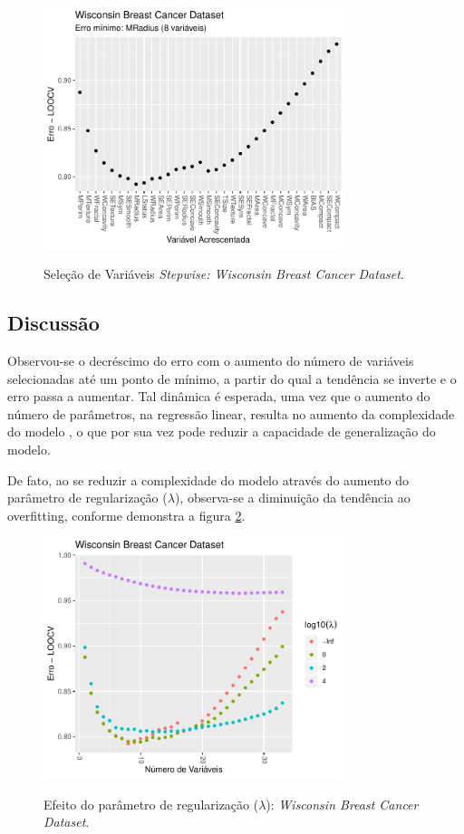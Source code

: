 \begin{figure}[!htb]
    \centering
    \caption{Seleção de Variáveis \textit{Stepwise: Wisconsin Breast Cancer Dataset}.}
    \includegraphics[height=200pt]{imgs/res/WisconsinBreastCancerDataset_validation}
    \label{fig:stepwise_WisconsinBreastCancer}
\end{figure}
\FloatBarrier

\subsection{Discussão}
Observou-se o decréscimo do erro com o aumento do número de variáveis selecionadas até um ponto de mínimo, a partir do qual a tendência se inverte e o erro passa a aumentar. Tal dinâmica é esperada, uma vez que o aumento do número de parâmetros, na regressão linear, resulta no aumento da complexidade do modelo \cite[p. 224]{statistical_learning}, o que por sua vez pode reduzir a capacidade de generalização do modelo. 

De fato, ao se reduzir a complexidade do modelo através do aumento do parâmetro de regularização ($\lambda$), observa-se a diminuição da tendência ao overfitting, conforme demonstra a figura \ref{fig:lambda_WisconsinBreastCancer}.

\begin{figure}[!htb]
    \centering
    \caption{Efeito do parâmetro de regularização ($\lambda$): \textit{Wisconsin Breast Cancer Dataset}.}
    \includegraphics[height=200pt]{imgs/res/WisconsinBreastCancerDataset_lambda}
    \label{fig:lambda_WisconsinBreastCancer}
\end{figure}

